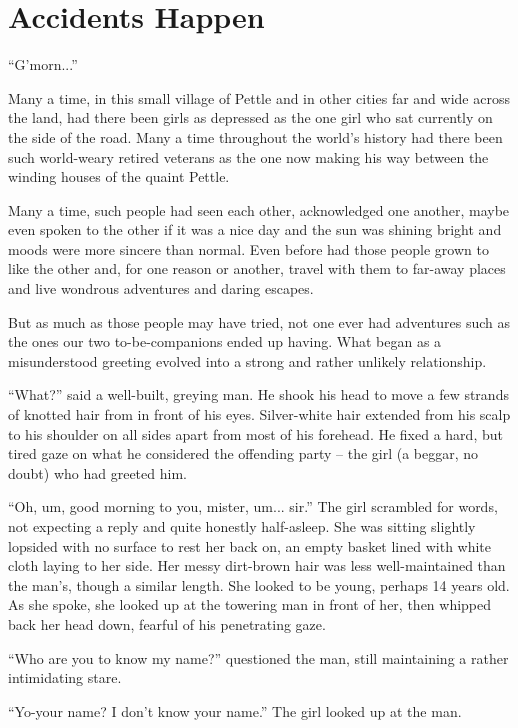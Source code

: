 \chapter{Accidents Happen}

``G'morn...''

Many a time, in this small village of Pettle and in other cities far and wide
across the land, had there been girls as depressed as the one girl who sat
currently on the side of the road. Many a time throughout the world's history
had there been such world-weary retired veterans as the one now making his way
between the winding houses of the quaint Pettle.

Many a time, such people had seen each other, acknowledged one another, maybe
even spoken to the other if it was a nice day and the sun was shining bright and
moods were more sincere than normal. Even before had those people grown to like
the other and, for one reason or another, travel with them to far-away places
and live wondrous adventures and daring escapes.

But as much as those people may have tried, not one ever had adventures such as
the ones our two to-be-companions ended up having. What began as a misunderstood
greeting evolved into a strong and rather unlikely relationship.

``What?'' said a well-built, greying man. He shook his head to move a few
strands of knotted hair from in front of his eyes. Silver-white hair extended
from his scalp to his shoulder on all sides apart from most of his forehead. He
fixed a hard, but tired gaze on what he considered the offending party -- the
girl (a beggar, no doubt) who had greeted him.

``Oh, um, good morning to you, mister, um... sir.'' The girl scrambled for
words, not expecting a reply and quite honestly half-asleep. She was sitting
slightly lopsided with no surface to rest her back on, an empty basket lined
with white cloth laying to her side. Her messy dirt-brown hair was less
well-maintained than the man's, though a similar length. She looked to be young,
perhaps 14 years old. As she spoke, she looked up at the towering man in front
of her, then whipped back her head down, fearful of his penetrating gaze.

``Who are you to know my name?'' questioned the man, still maintaining a rather
intimidating stare.

``Yo-your name? I don't know your name.'' The girl looked up at the man.

